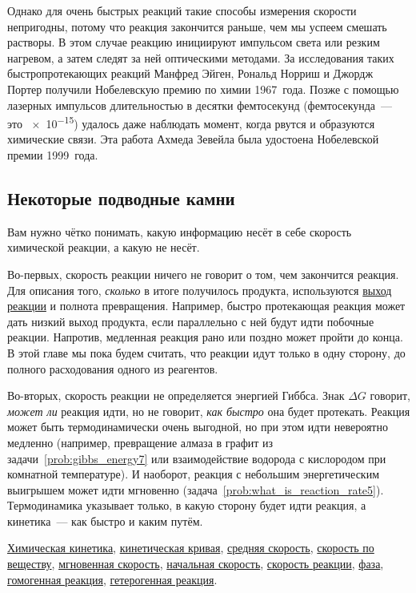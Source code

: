Однако для очень быстрых реакций такие способы измерения скорости непригодны, потому что реакция закончится раньше, чем мы успеем смешать растворы. В этом случае реакцию инициируют импульсом света или резким нагревом, а затем следят за ней оптическими методами. За исследования таких быстропротекающих реакций Манфред Эйген, Рональд Норриш и Джордж Портер получили Нобелевскую премию по химии 1967~года. Позже с помощью лазерных импульсов длительностью в десятки фемтосекунд (фемтосекунда~--- это \qty{e-15}{\ruS}) удалось даже наблюдать момент, когда рвутся и образуются химические связи. Эта работа Ахмеда Зевейла была удостоена Нобелевской премии 1999~года.

\subsection*{Некоторые подводные камни}

Вам нужно чётко понимать, какую информацию несёт в себе скорость химической реакции, а какую не несёт.

Во-первых, скорость реакции ничего не говорит о том, чем закончится реакция. Для описания того, \emph{сколько} в итоге получилось продукта, используются \hyperref[term:yield]{выход реакции} и полнота превращения. Например, быстро протекающая реакция может дать низкий выход продукта, если параллельно с ней будут идти побочные реакции. Напротив, медленная реакция рано или поздно может пройти до конца. В этой главе мы пока будем считать, что реакции идут только в одну сторону, до полного расходования одного из реагентов.

Во-вторых, скорость реакции не определяется энергией Гиббса. Знак $\Delta G$ говорит, \emph{может ли} реакция идти, но не говорит, \emph{как быстро} она будет протекать. Реакция может быть термодинамически очень выгодной, но при этом идти невероятно медленно (например, превращение алмаза в графит из задачи~\ref{prob:gibbs_energy7} или взаимодействие водорода с кислородом при комнатной температуре). И наоборот, реакция с небольшим энергетическим выигрышем может идти мгновенно (задача~\ref{prob:what_is_reaction_rate5}). Термодинамика указывает только, в какую сторону будет идти реакция, а кинетика~--- как быстро и каким путём.

\begin{termlist}
    \hyperref[term:chemical_kinetics]{Химическая кинетика},
    \hyperref[term:kinetic_curve]{кинетическая кривая},
    \hyperref[term:average_rate]{средняя скорость},
    \hyperref[term:rate_by_substance]{скорость по веществу},
    \hyperref[term:instantaneous_rate]{мгновенная скорость},
    \hyperref[term:initial_rate]{начальная скорость},
    \hyperref[term:reaction_rate]{скорость реакции},
    \hyperref[term:phase]{фаза},
    \hyperref[term:homogeneous_reaction]{гомогенная реакция},
    \hyperref[term:heterogeneous_reaction]{гетерогенная реакция}.
\end{termlist}

